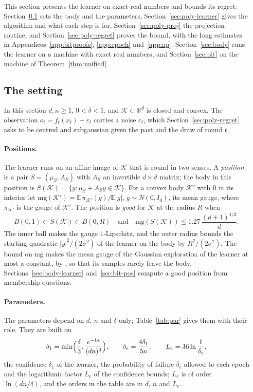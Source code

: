 \documentclass[11pt]{amsart}
\theoremstyle{definition}
\numberwithin{equation}{section}
\newcommand{\R}{\mathbb{R}}
\newcommand{\E}{\mathbb{E}}
\newcommand{\cK}{\mathcal{K}}
\begin{document}
This section presents the learner on exact real numbers and bounds its regret: Section~\ref{sec:poly-setting} sets the body and the parameters, Section~\ref{sec:poly-learner} gives the algorithm and what each step is for, Section~\ref{sec:poly-proj} the projection routine, and Section~\ref{sec:poly-regret} proves the bound, with the long estimates in Appendices~\ref{app:bitproofs}, \ref{app:epoch} and~\ref{app:ap}. Section~\ref{sec:body} runs the learner on a machine with exact real numbers, and Section~\ref{sec:bit} on the machine of Theorem~\ref{thm:unified}.

\subsection{The setting}\label{sec:poly-setting}

In this section $d,n\ge1$, $0<\delta<1$, and $\cK\subset\R^d$ is closed and convex. The observation $o_t=f_t(x_t)+\varepsilon_t$ carries a noise $\varepsilon_t$, which Section~\ref{sec:poly-regret} asks to be centred and subgaussian given the past and the draw of round $t$.

\paragraph{Positions.} The learner runs on an affine image of $\cK$ that is round in two senses. A \emph{position} is a pair $S=(\mu_S,A_S)$ with $A_S$ an invertible $d\times d$ matrix; the body in this position is $S(\cK)=\{y:\mu_S+A_Sy\in\cK\}$. For a convex body $\cK'$ with $0$ in its interior let $\mathrm{mg}(\cK')=\E\,\pi_{\cK'}(g)/\E|g|$, $g\sim N(0,I_d)$, its mean gauge, where $\pi_{\cK'}$ is the gauge of $\cK'$. The position is \emph{good} for $\cK$ at the radius $R$ when
\begin{equation}\label{eq:good}
B(0,1)\subset S(\cK)\subset B(0,R)\quad\text{and}\quad \mathrm{mg}(S(\cK))\le1.27\,\frac{(d+1)^{1/2}}d .
\end{equation}
The inner ball makes the gauge $1$-Lipschitz, and the outer radius bounds the starting quadratic $|y|^2/(2\sigma^2)$ of the learner on the body by $R^2/(2\sigma^2)$. The bound on $\mathrm{mg}$ makes the mean gauge of the Gaussian exploration of the learner at most a constant, by \cite[Lemma~10.5]{Lat24}, so that its samples rarely leave the body. Sections~\ref{sec:body-learner} and~\ref{sec:bit-pos} compute a good position from membership questions.

\paragraph{Parameters.} The parameters depend on $d$, $n$ and $\delta$ only; Table~\ref{tab:par} gives them with their role. They are built on
\[
\delta_1=\min\Bigl(\frac\delta3,\frac{e^{-14}}{(dn)^3}\Bigr),\qquad\delta_e=\frac{4\delta_1}{5n},\qquad L_e=36\ln\frac1{\delta_e},
\]
the confidence $\delta_1$ of the learner, the probability of failure $\delta_e$ allowed to each epoch and the logarithmic factor $L_e$ of the confidence bounds; $L_e$ is of order $\ln(dn/\delta)$, and the orders in the table are in $d$, $n$ and $L_e$.
\end{document}
